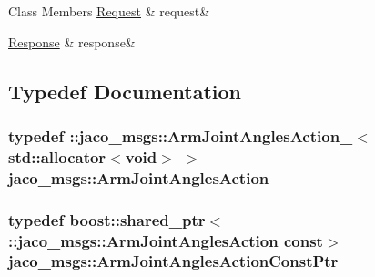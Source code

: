 \begin{DoxyFields}{Class Members}
\hyperlink{namespacejaco__msgs_a5c2942c9b9b1fe5330e2b79bfaef2847}{Request}\hypertarget{namespacejaco__msgs_aeb840620ab8411467aecb215fbce29fb}{}\label{namespacejaco__msgs_aeb840620ab8411467aecb215fbce29fb}
&
request&
\\
\hline

\hyperlink{namespacejaco__msgs_aad03f8a7d16be1d6f6a0c1b2faf9cef2}{Response}\hypertarget{namespacejaco__msgs_a850aa3fcde47224344b32d7055b7e2d6}{}\label{namespacejaco__msgs_a850aa3fcde47224344b32d7055b7e2d6}
&
response&
\\
\hline

\end{DoxyFields}


\subsection{Typedef Documentation}
\subsubsection[{\texorpdfstring{Arm\+Joint\+Angles\+Action}{ArmJointAnglesAction}}]{\setlength{\rightskip}{0pt plus 5cm}typedef \+::{\bf jaco\+\_\+msgs\+::\+Arm\+Joint\+Angles\+Action\+\_\+}$<$std\+::allocator$<$void$>$ $>$ {\bf jaco\+\_\+msgs\+::\+Arm\+Joint\+Angles\+Action}}\hypertarget{namespacejaco__msgs_afc04c716621af8a0dfe0968d1db0f90c}{}\label{namespacejaco__msgs_afc04c716621af8a0dfe0968d1db0f90c}
\subsubsection[{\texorpdfstring{Arm\+Joint\+Angles\+Action\+Const\+Ptr}{ArmJointAnglesActionConstPtr}}]{\setlength{\rightskip}{0pt plus 5cm}typedef boost\+::shared\+\_\+ptr$<$ \+::{\bf jaco\+\_\+msgs\+::\+Arm\+Joint\+Angles\+Action} const$>$ {\bf jaco\+\_\+msgs\+::\+Arm\+Joint\+Angles\+Action\+Const\+Ptr}}\hypertarget{namespacejaco__msgs_ae669d71e95bd7ea4a487c1f7462ee8bf}{}\label{namespacejaco__msgs_ae669d71e95bd7ea4a487c1f7462ee8bf}
